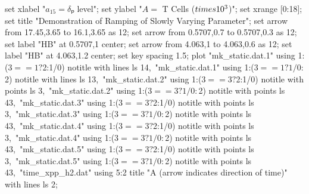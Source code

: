   set xlabel "$a_{15} = δₚ$ level";
  set ylabel "$A = $ T Cells ($\\times 10^3$)";
  set xrange [0:18];
  set title "Demonstration of Ramping of Slowly Varying Parameter";
  set arrow from 17.45,3.65 to 16.1,3.65 as 12;
  set arrow from 0.5707,0.7 to 0.5707,0.3 as 12;
  set label "HB" at 0.5707,1 center;
  set arrow from 4.063,1 to 4.063,0.6 as 12;
  set label "HB" at 4.063,1.2 center;
  set key spacing 1.5;
  plot "mk_static.dat.1" using 1:($3==1?$2:1/0) notitle with lines ls 14,\
       "mk_static.dat.1" using 1:($3==1?1/0:$2) notitle with lines ls 13,\
       "mk_static.dat.2" using 1:($3==3?$2:1/0) notitle with points ls 3,\
       "mk_static.dat.2" using 1:($3==3?1/0:$2) notitle with points ls 43,\
       "mk_static.dat.3" using 1:($3==3?$2:1/0) notitle with points ls 3,\
       "mk_static.dat.3" using 1:($3==3?1/0:$2) notitle with points ls 43,\
       "mk_static.dat.4" using 1:($3==3?$2:1/0) notitle with points ls 3,\
       "mk_static.dat.4" using 1:($3==3?1/0:$2) notitle with points ls 43,\
       "mk_static.dat.5" using 1:($3==3?$2:1/0) notitle with points ls 3,\
       "mk_static.dat.5" using 1:($3==3?1/0:$2) notitle with points ls 43,\
       "time_xpp_h2.dat" using 5:2 title "A (arrow indicates direction of time)" with lines ls 2;
\stopGNUPLOTscript

